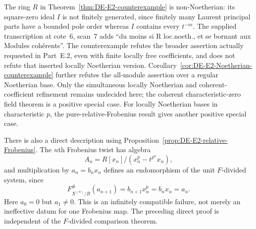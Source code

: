 \begin{remark}\label{rem:DE-E2-Noetherian-scope}
The ring $R$ in Theorem~\ref{thm:DE-E2-counterexample} is non-Noetherian: its square-zero ideal $I$ is not finitely generated, since finitely many Laurent principal parts have a bounded pole order whereas $I$ contains every $t^{-m}$.  The supplied transcription at cote~6, scan~7 adds ``du moins si R loc.noeth., et se bornant aux Modules coh\'erents''.  The counterexample refutes the broader assertion actually requested in Part~E.2, even with finite locally free coefficients, and does not refute that inserted locally Noetherian version.  Corollary~\ref{cor:DE-E2-Noetherian-counterexample} further refutes the all-module assertion over a regular Noetherian base.  Only the simultaneous locally Noetherian and coherent-coefficient refinement remains undecided here; the coherent characteristic-zero field theorem is a positive special case.  For locally Noetherian bases in characteristic $p$, the pure-relative-Frobenius result gives another positive special case.

There is also a direct description using Proposition~\ref{prop:DE-E2-relative-Frobenius}.  The $n$th Frobenius twist has algebra
\[
 A_n=R[x_n]/(x_n^p-t^{p^n}x_n),
\]
and multiplication by $a_n=b_nx_n$ defines an endomorphism of the unit $F$-divided system, since
\[
 F_{X^{(n)}/R}^{\#}(a_{n+1})
       =b_{n+1}x_n^p=b_nx_n=a_n.
\]
Here $a_0=0$ but $a_1\ne0$.  This is an infinitely compatible failure, not merely an ineffective datum for one Frobenius map.  The preceding direct proof is independent of the $F$-divided comparison theorem.
\end{remark}
